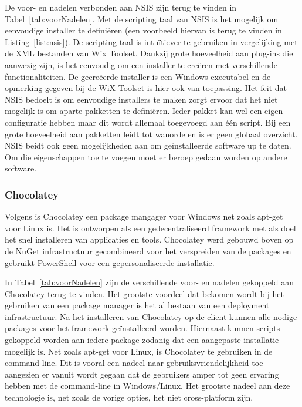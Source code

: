 De voor- en nadelen verbonden aan NSIS zijn terug te vinden in Tabel~\ref{tab:voorNadelen}.
Met de scripting taal van NSIS is het mogelijk om eenvoudige installer te definiëren (een voorbeeld hiervan is terug te vinden in Listing~\vref{list:nsis}).
De scripting taal is intuïtiever te gebruiken in vergelijking met de XML bestanden van Wix Toolset.
Dankzij grote hoeveelheid aan plug-ins die aanwezig zijn, is het eenvoudig om een installer te creëren met verschillende functionaliteiten.
De gecreëerde installer is een Windows executabel en de opmerking gegeven bij de WiX Toolset is hier ook van toepassing.
Het feit dat NSIS bedoelt is om eenvoudige installers te maken zorgt ervoor dat het niet mogelijk is om aparte pakketten te definiëren.
Ieder pakket kan wel een eigen configuratie hebben maar dit wordt allemaal toegevoegd aan één script.
Bij een grote hoeveelheid aan pakketten leidt tot wanorde en is er geen globaal overzicht.
NSIS beidt ook geen mogelijkheden aan om geïnstalleerde software up te daten.
Om die eigenschappen toe te voegen moet er beroep gedaan worden op andere software.

\subsubsection{Chocolatey}
Volgens \citep{chocoAbout} is Chocolatey een package mangager voor Windows net zoals apt-get voor Linux is.
Het is ontworpen als een gedecentraliseerd framework met als doel het snel installeren van applicaties en tools.
Chocolatey werd gebouwd boven op de NuGet infrastructuur gecombineerd voor het verspreiden van de packages en gebruikt PowerShell voor een gepersonaliseerde installatie.

In Tabel~\ref{tab:voorNadelen} zijn de verschillende voor- en nadelen gekoppeld aan Chocolatey terug te vinden.
Het grootste voordeel dat bekomen wordt bij het gebruiken van een package manager is het al bestaan van een deployment infrastructuur. 
Na het installeren van Chocolatey op de client kunnen alle nodige packages voor het framework geïnstalleerd worden.
Hiernaast kunnen scripts gekoppeld worden aan iedere package zodanig dat een aangepaste installatie mogelijk is.
Net zoals apt-get voor Linux, is Chocolatey te gebruiken in de command-line.
Dit is vooral een nadeel naar gebruiksvriendelijkheid toe aangezien er vanuit wordt gegaan dat de gebruikers amper tot geen ervaring hebben met de command-line in Windows/Linux.
Het grootste nadeel aan deze technologie is, net zoals de vorige opties, het niet cross-platform zijn.

